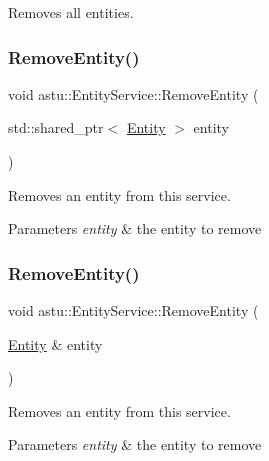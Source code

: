 Removes all entities. \mbox{\label{classastu_1_1EntityService_a748a71e470d5bb51bb650b15e0a78c63}} 
\subsubsection{\texorpdfstring{Remove\+Entity()}{RemoveEntity()}\hspace{0.1cm}{\footnotesize\ttfamily [1/2]}}
{\footnotesize\ttfamily void astu\+::\+Entity\+Service\+::\+Remove\+Entity (\begin{DoxyParamCaption}\item[{std\+::shared\+\_\+ptr$<$ \hyperlink{classastu_1_1Entity}{Entity} $>$}]{entity }\end{DoxyParamCaption})}

Removes an entity from this service.


\begin{DoxyParams}{Parameters}
{\em entity} & the entity to remove \\
\hline
\end{DoxyParams}
\mbox{\label{classastu_1_1EntityService_ac543fe51a3d1c9784bcab5775f5d388d}} 
\subsubsection{\texorpdfstring{Remove\+Entity()}{RemoveEntity()}\hspace{0.1cm}{\footnotesize\ttfamily [2/2]}}
{\footnotesize\ttfamily void astu\+::\+Entity\+Service\+::\+Remove\+Entity (\begin{DoxyParamCaption}\item[{\hyperlink{classastu_1_1Entity}{Entity} \&}]{entity }\end{DoxyParamCaption})\hspace{0.3cm}{\ttfamily [inline]}}

Removes an entity from this service.


\begin{DoxyParams}{Parameters}
{\em entity} & the entity to remove \\
\hline
\end{DoxyParams}
\mbox{\label{classastu_1_1EntityService_af9b12ecd243f0b0f98799fa2d147fecb}} 
